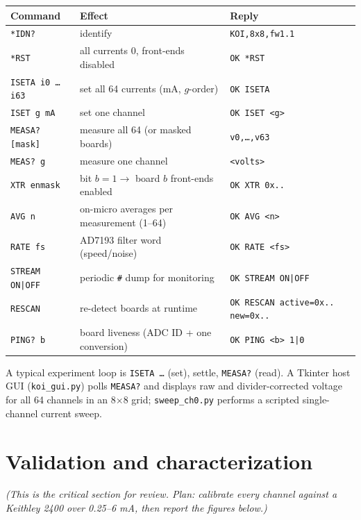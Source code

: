 \documentclass[11pt]{article}
\newif\ifdraft\drafttrue
\newcommand{\note}[1]{\ifdraft{\color{blue!60!black}\textit{(#1)}}\fi}
\begin{document}
\renewcommand{\arraystretch}{1.2}
\noindent\begin{tabularx}{\textwidth}{@{}L{3.2cm} X L{4.2cm}@{}}
\toprule
\textbf{Command} & \textbf{Effect} & \textbf{Reply} \\
\midrule
\texttt{*IDN?}            & identify & \texttt{KOI,8x8,fw1.1} \\
\texttt{*RST}             & all currents 0, front-ends disabled & \texttt{OK *RST} \\
\texttt{ISETA i0 \dots i63} & set all 64 currents (mA, $g$-order) & \texttt{OK ISETA} \\
\texttt{ISET g mA}        & set one channel & \texttt{OK ISET <g>} \\
\texttt{MEASA? [mask]}    & measure all 64 (or masked boards) & \texttt{v0,\dots,v63} \\
\texttt{MEAS? g}          & measure one channel & \texttt{<volts>} \\
\texttt{XTR enmask}       & bit $b=1\to$ board $b$ front-ends enabled & \texttt{OK XTR 0x..} \\
\texttt{AVG n}            & on-micro averages per measurement (1--64) & \texttt{OK AVG <n>} \\
\texttt{RATE fs}          & AD7193 filter word (speed/noise) & \texttt{OK RATE <fs>} \\
\texttt{STREAM ON|OFF}    & periodic \texttt{\#} dump for monitoring & \texttt{OK STREAM ON|OFF} \\
\texttt{RESCAN}           & re-detect boards at runtime & \texttt{OK RESCAN active=0x.. new=0x..} \\
\texttt{PING? b}          & board liveness (ADC ID + one conversion) & \texttt{OK PING <b> 1|0} \\
\bottomrule
\end{tabularx}
\renewcommand{\arraystretch}{1.0}

\medskip
A typical experiment loop is \texttt{ISETA \dots} (set), settle, \texttt{MEASA?}
(read). A Tkinter host GUI (\texttt{koi\_gui.py}) polls \texttt{MEASA?} and
displays raw and divider-corrected voltage for all 64 channels in an 8$\times$8
grid; \texttt{sweep\_ch0.py} performs a scripted single-channel current sweep.

\section{Validation and characterization}
\label{sec:validation}
\note{This is the critical section for review. Plan: calibrate every channel
against a Keithley 2400 over 0.25--6 mA, then report the figures below.}
\end{document}
